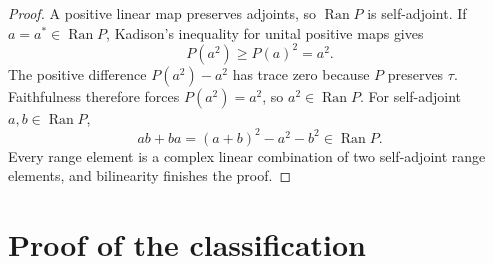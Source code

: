 \documentclass[11pt]{article}
\newcommand{\Ran}{\operatorname{Ran}}
\begin{document}
\begin{proof}
A positive linear map preserves adjoints, so $\Ran P$ is self-adjoint.  If
$a=a^*\in\Ran P$, Kadison's inequality for unital positive maps
\cite{kadison} gives
\[
 P(a^2)\ge P(a)^2=a^2.
\]
The positive difference $P(a^2)-a^2$ has trace zero because $P$ preserves
$\tau$.  Faithfulness therefore forces $P(a^2)=a^2$, so $a^2\in\Ran P$.
For self-adjoint $a,b\in\Ran P$,
\[
 ab+ba=(a+b)^2-a^2-b^2\in\Ran P.
\]
Every range element is a complex linear combination of two self-adjoint range
elements, and bilinearity finishes the proof.
\end{proof}

\section{Proof of the classification}
\end{document}
